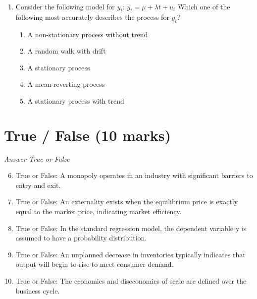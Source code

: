 \documentclass[12pt]{article}
\begin{document}
\begin{enumerate}[label=\arabic*.]
\begin{enumerate}[label=(\alph*)]
    \item affect domestic prices: the former lowers them while the latter raises them.
    \item reduce the overall cost of goods for consumers.
    \item have no impact on the volume of trade between nations.
    \item result in higher domestic prices.
    \item ensure the stability of international markets without influencing domestic markets.
\end{enumerate}
\item Consider the following model for $y_t$: $y_t = \mu + \lambda t + u_t$ Which one of the following most accurately describes the process for $y_t$?
\begin{enumerate}[label=(\alph*)]
    \item A non-stationary process without trend
    \item A random walk with drift
    \item A stationary process
    \item A mean-reverting process
    \item A stationary process with trend
\end{enumerate}
\end{enumerate}

\section*{True / False (10 marks)}
\textit{Answer True or False}
\begin{enumerate}[label=\arabic*.]
\setcounter{enumi}{5}
\item True or False: A monopoly operates in an industry with significant barriers to entry and exit.
\item True or False: An externality exists when the equilibrium price is exactly equal to the market price, indicating market efficiency.
\item True or False: In the standard regression model, the dependent variable y is assumed to have a probability distribution.
\item True or False: An unplanned decrease in inventories typically indicates that output will begin to rise to meet consumer demand.
\item True or False: The economies and diseconomies of scale are defined over the business cycle.
\end{enumerate}
\end{document}
